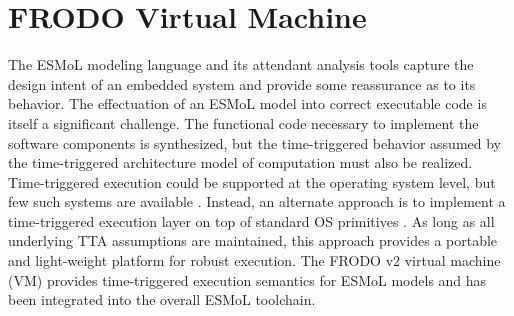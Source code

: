 \section{FRODO Virtual Machine}
\label{Section:FRODO}

The ESMoL modeling language and its attendant analysis tools capture the design intent of an embedded system and provide some reassurance as to its behavior.  The effectuation of an ESMoL model into correct executable code is itself a significant challenge.  The functional code necessary to implement the software components is synthesized, but the time-triggered behavior assumed by the time-triggered architecture model of computation must also be realized.  Time-triggered execution could be supported at the operating system level, but few such systems are available \cite{ttp_os, osek_tt}.  Instead, an alternate approach is to implement a time-triggered execution layer on top of standard OS primitives \cite{hhk_01,ccmstn_03,YYY}.  As long as all underlying TTA assumptions are maintained, this approach provides a portable and light-weight platform for robust execution.  The FRODO v2 virtual machine (VM) provides time-triggered execution semantics for ESMoL models and has been integrated into the overall ESMoL toolchain.



